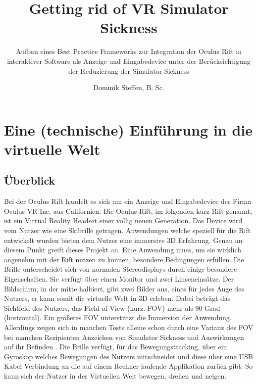\documentclass[pagesize, paper=a4, fontsize=12pt,titlepage=true, headings=small, headnosepline, abstractoff, liststotoc, nochapterprefix, plainheadsepline]{scrreprt}
\author{
Dominik Steffen, B. Sc.
}
\title{Getting rid of VR Simulator Sickness}
\subtitle{Aufbau eines Best Practice Frameworks zur Integration der Oculus Rift in interaktiver Software als Anzeige und Eingabedevice unter der Berücksichtigung der Reduzierung der Simulator Sickness}
\begin{document}
\maketitle
%


\begingroup
	\tableofcontents
	\thispagestyle{empty}
\endgroup


\renewcommand*{\chapterpagestyle}{plain}
\pagestyle{plain}
\setcounter{page}{0}

\chapter{Eine (technische) Einführung in die virtuelle Welt}

\section{Überblick}
Bei der Oculus Rift handelt es sich um ein Anzeige und Eingabedevice der Firma Oculus VR Inc. aus Californien. Die Oculus Rift, im folgenden kurz Rift genannt, ist ein Virtual Reality Headset einer völlig neuen Generation. Das Device wird vom Nutzer wie eine Skibrille getragen. Anwendungen welche speziell für die Rift entwickelt wurden bieten dem Nutzer eine immersive 3D Erfahrung. Genau an diesem Punkt greift dieses Projekt an. Eine Anwendung muss, um sie wirklich angenehm mit der Rift nutzen zu können, besondere Bedingungen erfüllen. Die Brille unterscheidet sich von normalen Stereodisplays durch einige besondere Eigenschaften. Sie verfügt über einen Monitor und zwei Linseneinsätze. Der Bildschirm, in der mitte halbiert, gibt zwei Bilder aus, eines für jedes Auge des Nutzers, er kann somit die virtuelle Welt in 3D erleben. Dabei beträgt das Sichtfeld des Nutzers, das Field of View (kurz. FOV) mehr als 90 Grad (horizontal). Ein größeres FOV unterstützt die Immersion der Anwendung. Allerdings zeigen sich in manchen Tests alleine schon durch eine Varianz des FOV bei manchen Rezipienten Anzeichen von Simulator Sickness und Auswirkungen auf ihr Befinden \cite{SeayKrumHodgesRibarsky2001}. Die Brille verfügt, für das Bewegungstracking, über ein Gyroskop welches Bewegungen des Nutzers mitschneidet und diese über eine USB Kabel Verbindung an die auf einem Rechner laufende Applikation zurück gibt. So kann sich der Nutzer in der Virtuellen Welt bewegen, drehen und neigen.
\end{document}
